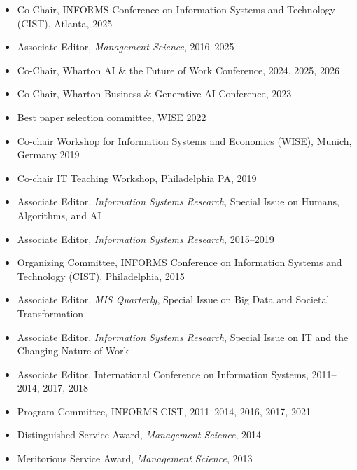 \documentclass[10pt,letterpaper]{article}
\begin{document}
\begin{itemize}
\item Co-Chair, INFORMS Conference on Information Systems and Technology (CIST), Atlanta, 2025
\item Associate Editor, \textit{Management Science}, 2016--2025
\item Co-Chair, Wharton AI \& the Future of Work Conference, 2024, 2025, 2026
\item Co-Chair, Wharton Business \& Generative AI Conference, 2023
\item Best paper selection committee, WISE 2022
\item Co-chair Workshop for Information Systems and Economics (WISE), Munich, Germany 2019
\item Co-chair IT Teaching Workshop, Philadelphia PA, 2019
\item Associate Editor, \textit{Information Systems Research}, Special Issue on Humans, Algorithms, and AI
\item Associate Editor, \textit{Information Systems Research}, 2015--2019
\item Organizing Committee, INFORMS Conference on Information Systems and Technology (CIST), Philadelphia, 2015
\item Associate Editor, \textit{MIS Quarterly}, Special Issue on Big Data and Societal Transformation
\item Associate Editor, \textit{Information Systems Research}, Special Issue on IT and the Changing Nature of Work
\item Associate Editor, International Conference on Information Systems, 2011--2014, 2017, 2018
\item Program Committee, INFORMS CIST, 2011--2014, 2016, 2017, 2021
\item Distinguished Service Award, \textit{Management Science}, 2014
\item Meritorious Service Award, \textit{Management Science}, 2013


\end{itemize}
\end{document}
